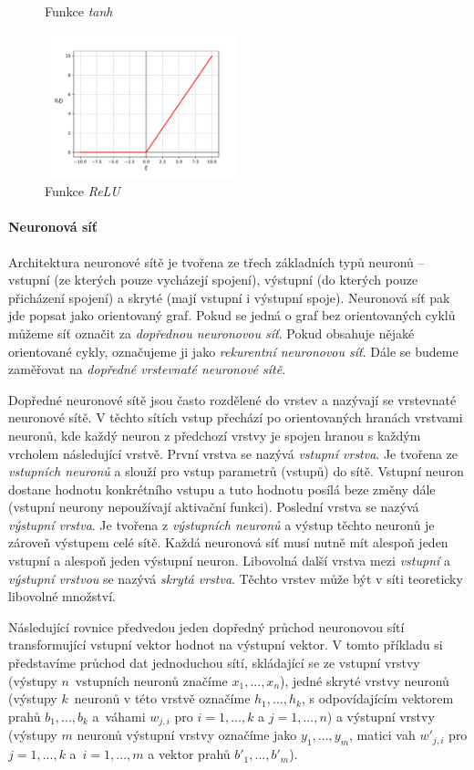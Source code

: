 \begin{figure}[!htb]
\begin{minipage}{0.5\textwidth}
        \caption{Funkce \emph{tanh}}
        \label{fig:graph_tanh}
    \end{minipage}
    \includegraphics[width=0.5\textwidth]{../img/graph_relu.pdf}
    \caption{Funkce \emph{ReLU}}
    \label{fig:graph_relu}
\end{figure}

\paragraph{Neuronová síť}
Architektura neuronové sítě je tvořena ze třech základních typů neuronů --
vstupní (ze kterých pouze vycházejí spojení), výstupní (do kterých pouze
přicházení spojení) a skryté (mají vstupní i výstupní spoje). Neuronová síť pak jde
popsat jako orientovaný graf. Pokud se jedná o graf bez orientovaných cyklů
můžeme síť označit za \emph{dopřednou neuronovou síť}. Pokud obsahuje nějaké
orientované cykly, označujeme ji jako \emph{rekurentní neuronovou síť}. Dále se
budeme zaměřovat na \emph{dopředné vrstevnaté neuronové sítě}.

Dopředné neuronové sítě jsou často rozdělené do vrstev a nazývají se vrstevnaté
neuronové sítě. V těchto sítích vstup přechází po orientovaných hranách
vrstvami neuronů, kde každý neuron z předchozí vrstvy je spojen hranou s každým
vrcholem následující vrstvě. První vrstva se nazývá \emph{vstupní vrstva}. Je
tvořena ze \emph{vstupních neuronů} a slouží pro vstup parametrů (vstupů) do
sítě. Vstupní neuron dostane hodnotu konkrétního vstupu a tuto hodnotu posílá
beze změny dále (vstupní neurony nepoužívají aktivační funkci). Poslední vrstva
se nazývá \emph{výstupní vrstva}. Je tvořena z \emph{výstupních neuronů} a
výstup těchto neuronů je zároveň výstupem celé sítě. Každá neuronová síť musí
nutně mít alespoň jeden vstupní a alespoň jeden výstupní neuron. Libovolná
další vrstva mezi \emph{vstupní} a \emph{výstupní vrstvou} se nazývá
\emph{skrytá vrstva}. Těchto vrstev může být v síti teoreticky libovolné
množství.

Následující rovnice předvedou jeden dopředný průchod neuronovou sítí
transformující vstupní vektor hodnot na výstupní vektor. V tomto příkladu si
představíme průchod dat jednoduchou sítí, skládající se ze vstupní vrstvy
(výstupy $n$~vstupních neuronů značíme $x_1,...,x_n$), jedné skryté vrstvy
neuronů (výstupy $k$~neuronů v této vrstvě označíme $h_1,...,h_k$, s
odpovídajícím vektorem prahů $b_1,...,b_k$ a~váhami $w_{j,i}$ pro $i=1,...,k$ a
$j=1,...,n$) a výstupní vrstvy (výstupy $m$ neuronů výstupní vrstvy označíme
jako $y_1,...,y_m$, matici vah $w'_{j,i}$ pro $j=1,...,k$ a~$i=1,...,m$ a
vektor prahů $b'_1,...,b'_m$).

